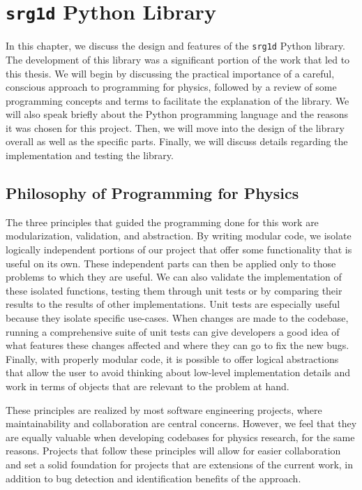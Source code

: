 \chapter{\texttt{srg1d} Python Library}\label{python_lib}

In this chapter, we discuss the design and features of the \texttt{srg1d} Python library. The development of this library was a significant portion of the work that led to this thesis. We will begin by discussing the practical importance of a careful, conscious approach to programming for physics, followed by a review of some programming concepts and terms to facilitate the explanation of the library. We will also speak briefly about the Python programming language and the reasons it was chosen for this project. Then, we will move into the design of the library overall as well as the specific parts. Finally, we will discuss details regarding the implementation and testing the library.

\section{Philosophy of Programming for Physics}

The three principles that guided the programming done for this work are modularization, validation, and abstraction. By writing modular code, we isolate logically independent portions of our project that offer some functionality that is useful on its own. These independent parts can then be applied only to those problems to which they are useful. We can also validate the implementation of these isolated functions, testing them through unit tests or by comparing their results to the results of other implementations. Unit tests are especially useful because they isolate specific use-cases. When changes are made to the codebase, running a comprehensive suite of unit tests can give developers a good idea of what features these changes affected and where they can go to fix the new bugs. Finally, with properly modular code, it is possible to offer logical abstractions that allow the user to avoid thinking about low-level implementation details and work in terms of objects that are relevant to the problem at hand.

These principles are realized by most software engineering projects, where maintainability and collaboration are central concerns. However, we feel that they are equally valuable when developing codebases for physics research, for the same reasons. Projects that follow these principles will allow for easier collaboration and set a solid foundation for projects that are extensions of the current work, in addition to bug detection and identification benefits of the approach.

